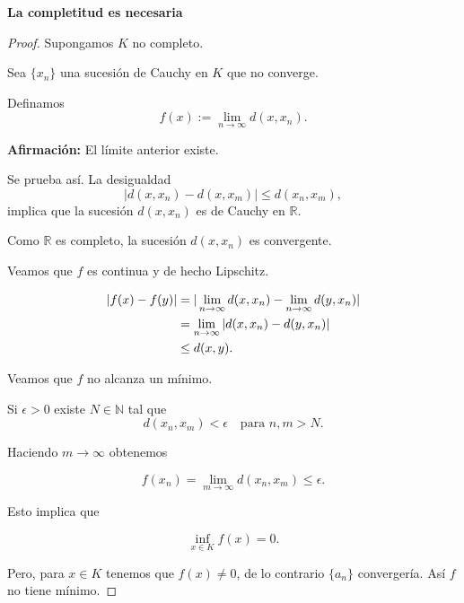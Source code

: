 \documentclass[a4,portrait]{seminar}
\newtheorem{thm}{Teorema}
\begin{document}
\begin{slide*}

\begin{center}
{\large \textbf{La completitud es necesaria}}
\end{center}



\begin{proof}  Supongamos $K$ no completo.

Sea $\{x_n\}$ una sucesi\'on de Cauchy en $K$ que no converge.

Definamos
\[
    f(x):=\lim\limits_{n\to\infty}d(x,x_n).
\]

\textbf{Afirmaci\'on:} El l\'imite anterior existe.

Se prueba as\'i. La desigualdad
\[
    |d(x,x_n)-d(x,x_m)|\leq d(x_n,x_m),
\]
implica  que la sucesi\'on $d(x,x_n)$ es de Cauchy en
$\mathbb{R}$.

Como $\mathbb{R}$ es completo, la sucesi\'on $d(x,x_n)$ es
convergente.

Veamos que $f$ es continua y de hecho Lipschitz.

\begin{equation}
\begin{split}
|f(x)-f(y)| &
=|\lim\limits_{n\to\infty}d(x,x_n)-\lim\limits_{n\to\infty}d(y,x_n)|\\
&= \lim\limits_{n\to\infty}|d(x,x_n)-d(y,x_n)|\\
&\leq d(x,y).
\end{split}\notag
\end{equation}

Veamos que $f$ no alcanza un m\'inimo.

Si $\epsilon>0$ existe $N\in\mathbb{N}$ tal que
\[
    d(x_n,x_m)<\epsilon\quad\text{para}\,\,n,m>N.
\]

Haciendo $m\to\infty$ obtenemos

\[
    f(x_n)=\lim\limits_{m\to\infty}d(x_n,x_m)\leq\epsilon.
\]

Esto implica que

\[
    \inf\limits_{x\in K}f(x)=0.
\]

Pero, para $x\in K$ tenemos que $f(x)\neq 0$, de lo contrario
$\{a_n\}$ converger\'ia. As\'i $f$ no tiene m\'inimo.


\end{proof}






\end{slide*}
\end{document}
